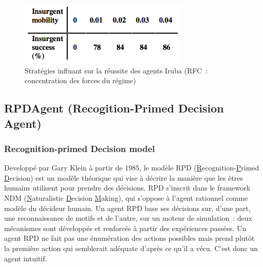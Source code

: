 \documentclass{article}
\begin{document}
\begin{center}
\begin{figure}[H]
\begin{minipage}[H]{0.4\linewidth}
\end{minipage}
\hfill
\begin{minipage}[H]{0.4\linewidth}
	\centering
	\includegraphics[width=\linewidth]{../ressources/iruba_mobility}
\end{minipage}
\caption{Stratégies influant sur la réussite des agents Iruba (RFC~: concentration des forces du régime)}
\end{figure}
\end{center}

\subsection{RPDAgent (Recogition-Primed Decision Agent)}
\subsubsection{Recognition-primed Decision model}
Developpé par Gary Klein à partir de 1985, le modèle RPD (\underline{R}ecognition-\underline{P}rimed \underline{D}ecision) est un modèle théorique qui vise à décrire la manière que les êtres humains utilisent pour prendre des décisions. RPD s'inscrit dans le framework NDM (\underline{N}aturalistic \underline{D}ecision \underline{M}aking), qui s'oppose à l'agent rationnel comme modèle du décideur humain.
Un agent RPD base ses décisions sur, d'une part, une reconnaissance de motifs et de l'autre, sur un moteur de simulation~: deux mécanismes sont développés et renforcés à partir des expériences passées. Un agent RPD ne fait pas une énumération des actions possibles mais prend plutôt la première action qui semblerait adéquate d'après ce qu'il a vécu. C'est donc un agent \og{}intuitif\fg{}.
\end{document}
